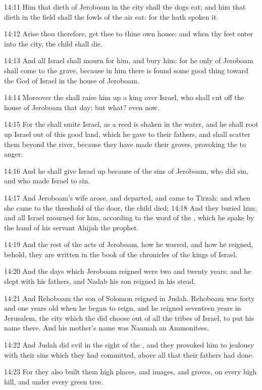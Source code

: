 14:11 Him that dieth of Jeroboam in the city shall the dogs eat; and
him that dieth in the field shall the fowls of the air eat: for the
\LORD hath spoken it.

14:12 Arise thou therefore, get thee to thine own house: and when thy
feet enter into the city, the child shall die.

14:13 And all Israel shall mourn for him, and bury him: for he only of
Jeroboam shall come to the grave, because in him there is found some
good thing toward the \LORD God of Israel in the house of Jeroboam.

14:14 Moreover the \LORD shall raise him up a king over Israel, who
shall cut off the house of Jeroboam that day: but what? even now.

14:15 For the \LORD shall smite Israel, as a reed is shaken in the
water, and he shall root up Israel out of this good land, which he
gave to their fathers, and shall scatter them beyond the river,
because they have made their groves, provoking the \LORD to anger.

14:16 And he shall give Israel up because of the sins of Jeroboam, who
did sin, and who made Israel to sin.

14:17 And Jeroboam's wife arose, and departed, and came to Tirzah: and
when she came to the threshold of the door, the child died; 14:18 And
they buried him; and all Israel mourned for him, according to the word
of the \LORD, which he spake by the hand of his servant Ahijah the
prophet.

14:19 And the rest of the acts of Jeroboam, how he warred, and how he
reigned, behold, they are written in the book of the chronicles of the
kings of Israel.

14:20 And the days which Jeroboam reigned were two and twenty years:
and he slept with his fathers, and Nadab his son reigned in his stead.

14:21 And Rehoboam the son of Solomon reigned in Judah. Rehoboam was
forty and one years old when he began to reign, and he reigned
seventeen years in Jerusalem, the city which the \LORD did choose out
of all the tribes of Israel, to put his name there. And his mother's
name was Naamah an Ammonitess.

14:22 And Judah did evil in the sight of the \LORD, and they provoked
him to jealousy with their sins which they had committed, above all
that their fathers had done.

14:23 For they also built them high places, and images, and groves, on
every high hill, and under every green tree.

